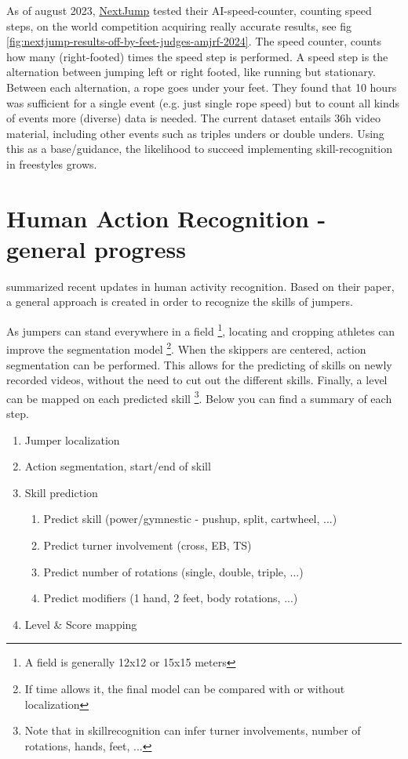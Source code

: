 As of august 2023, \href{https://nextjump.app/}{NextJump} tested their AI-speed-counter, counting speed steps, on the world competition acquiring really accurate results, see fig \ref{fig:nextjump-results-off-by-feet-judges-amjrf-2024}.
The speed counter, counts how many (right-footed) times the speed step is performed. A speed step is the alternation between jumping left or right footed, like running but stationary. Between each alternation, a rope goes under your feet.
They found that 10 hours was sufficient for a single event (e.g. just single rope speed) but to count all kinds of events more (diverse) data is needed. The current dataset entails 36h video material, including other events such as triples unders or double unders. Using this as a base/guidance, the likelihood to succeed implementing skill-recognition in freestyles grows.


\section{Human Action Recognition - general progress}

\textcite{Pareek_2020} summarized recent updates in human activity recognition. Based on their paper, a general approach is created in order to recognize the skills of jumpers.

As jumpers can stand everywhere in a field \footnote{A field is generally 12x12 or 15x15 meters}, locating and cropping athletes can improve the segmentation model \footnote{If time allows it, the final model can be compared with or without localization}. When the skippers are centered, action segmentation can be performed. This allows for the predicting of skills on newly recorded videos, without the need to cut out the different skills. Finally, a level can be mapped on each predicted skill \footnote{Note that in skillrecognition can infer turner involvements, number of rotations, hands, feet, ...}. Below you can find a summary of each step.

\begin{enumerate}
    \item Jumper localization
    \item Action segmentation, start/end of skill
    \item Skill prediction
    \begin{enumerate}
        \item Predict skill (power/gymnestic - pushup, split, cartwheel, ...)
        \item Predict turner involvement (cross, EB, TS)
        \item Predict number of rotations (single, double, triple, ...)
        \item Predict modifiers (1 hand, 2 feet, body rotations, ...)
    \end{enumerate}
    \item Level \& Score mapping
\end{enumerate}

